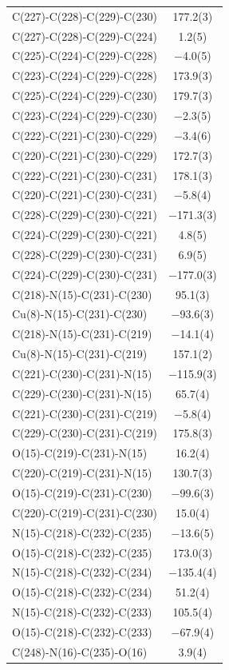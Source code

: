 \begin{center}
{\begin{supertabular}{p{1.8in}c}
C(227)-C(228)-C(229)-C(230)&177.2(3)\\
C(227)-C(228)-C(229)-C(224)&1.2(5)\\
C(225)-C(224)-C(229)-C(228)&$-$4.0(5)\\
C(223)-C(224)-C(229)-C(228)&173.9(3)\\
C(225)-C(224)-C(229)-C(230)&179.7(3)\\
C(223)-C(224)-C(229)-C(230)&$-$2.3(5)\\
C(222)-C(221)-C(230)-C(229)&$-$3.4(6)\\
C(220)-C(221)-C(230)-C(229)&172.7(3)\\
C(222)-C(221)-C(230)-C(231)&178.1(3)\\
C(220)-C(221)-C(230)-C(231)&$-$5.8(4)\\
C(228)-C(229)-C(230)-C(221)&$-$171.3(3)\\
C(224)-C(229)-C(230)-C(221)&4.8(5)\\
C(228)-C(229)-C(230)-C(231)&6.9(5)\\
C(224)-C(229)-C(230)-C(231)&$-$177.0(3)\\
C(218)-N(15)-C(231)-C(230)&95.1(3)\\
Cu(8)-N(15)-C(231)-C(230)&$-$93.6(3)\\
C(218)-N(15)-C(231)-C(219)&$-$14.1(4)\\
Cu(8)-N(15)-C(231)-C(219)&157.1(2)\\
C(221)-C(230)-C(231)-N(15)&$-$115.9(3)\\
C(229)-C(230)-C(231)-N(15)&65.7(4)\\
C(221)-C(230)-C(231)-C(219)&$-$5.8(4)\\
C(229)-C(230)-C(231)-C(219)&175.8(3)\\
O(15)-C(219)-C(231)-N(15)&16.2(4)\\
C(220)-C(219)-C(231)-N(15)&130.7(3)\\
O(15)-C(219)-C(231)-C(230)&$-$99.6(3)\\
C(220)-C(219)-C(231)-C(230)&15.0(4)\\
N(15)-C(218)-C(232)-C(235)&$-$13.6(5)\\
O(15)-C(218)-C(232)-C(235)&173.0(3)\\
N(15)-C(218)-C(232)-C(234)&$-$135.4(4)\\
O(15)-C(218)-C(232)-C(234)&51.2(4)\\
N(15)-C(218)-C(232)-C(233)&105.5(4)\\
O(15)-C(218)-C(232)-C(233)&$-$67.9(4)\\
C(248)-N(16)-C(235)-O(16)&3.9(4)\\

\end{supertabular}}
\end{center}
